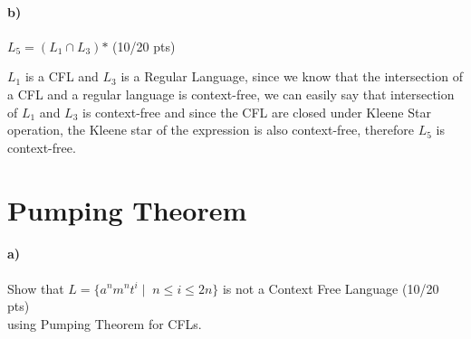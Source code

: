 \documentclass[a4paper,12pt]{article}
\begin{document}
\paragraph{b)} $L_5 = (L_1 \cap L_3)\text{*}$ \hfill \small{(10/20 pts)} \\

\begin{tcolorbox}
$L_1$ is a CFL and $L_3$ is a Regular Language, since we know that the intersection of a CFL and a regular language is context-free, we can easily say that intersection of $L_1$ and $L_3$ is context-free and since the CFL are closed under Kleene Star operation, the Kleene star of the expression is also context-free, therefore $L_5$ is context-free.
\end{tcolorbox}





\newpage
\section{Pumping Theorem \hfill {}}

\paragraph{a)} Show that $L=\{a^n m^n t^i \mid \; n\leq i \leq 2n\}$ is not a Context Free Language \hfill \small{(10/20 pts)} \\
using Pumping Theorem for CFLs. \\
\end{document}

